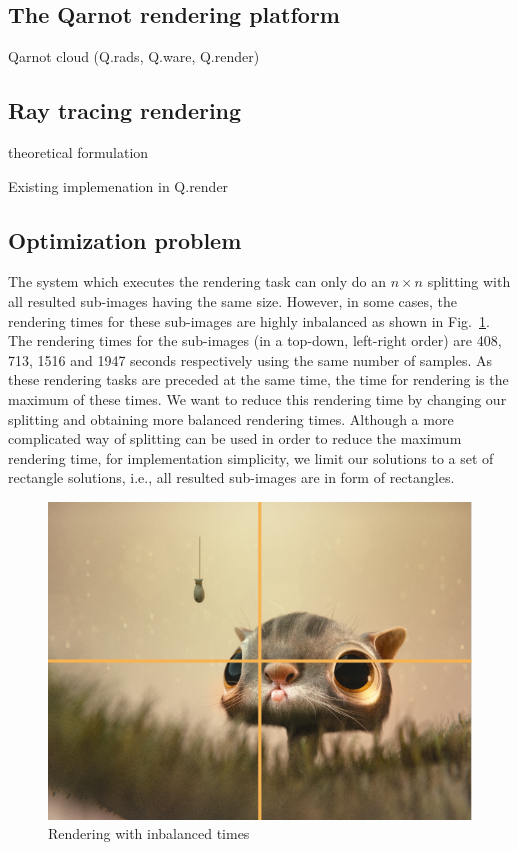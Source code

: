 \documentclass[10pt, conference, compsocconf]{IEEEtran}
\begin{document}
\subsection{The Qarnot rendering platform}

Qarnot cloud (Q.rads, Q.ware, Q.render)

\subsection{Ray tracing rendering}

theoretical formulation

Existing implemenation in Q.render

\subsection{Optimization problem}

The system which executes the rendering task can only do an $n\times n$ splitting with all resulted sub-images having the same size. However, in some cases, the rendering times for these sub-images  are highly inbalanced as shown in Fig.~\ref{decou_re}. The rendering times for the sub-images (in a top-down, left-right order) are 408, 713, 1516 and 1947 seconds respectively using the same number of samples. As these rendering tasks are preceded at the same time, the time for rendering is the maximum of these times. We want to reduce this rendering time by changing our splitting and obtaining more balanced rendering times. Although a more complicated way of splitting can be used in order to reduce the maximum rendering time, for implementation simplicity, we limit our solutions to a set of rectangle solutions, i.e., all resulted sub-images are in form of rectangles.


\begin{figure}[htbp]
\centerline{\includegraphics{decou_re}}
\caption{Rendering with inbalanced times}
\label{decou_re}
\end{figure}
\end{document}
